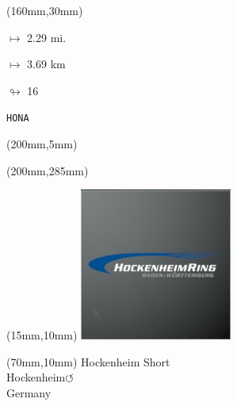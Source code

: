 \begin{textblock*}{40mm}(160mm,30mm)%
\Large
\par$\mapsto$ 2.29 mi.
\par$\mapsto$ 3.69 km
\par$\looparrowright$ 16
\par\hfill\tiny\tt HONA\\
\end{textblock*}
\begin{textblock*}{20mm}(200mm,5mm)%
\fbox{\thepage}
\label{HONA}
\end{textblock*}
\begin{textblock*}{20mm}(200mm,285mm)%
\fbox{\thepage}
\end{textblock*}

\null\newpage
\begin{textblock*}{50mm}(15mm,10mm)%
\includegraphics[width=50mm]{LG/2015-05-20_00082.png}
\end{textblock*}
\begin{textblock*}{130mm}(70mm,10mm)%
{\fontsize{20}{20}\selectfont Hockenheim Short\\}
{\fontsize{16}{16}\selectfont Hockenheim\hfill \huge$\circlearrowleft$\\}
{\fontsize{12}{12}\selectfont Germany\\}
\end{textblock*}
